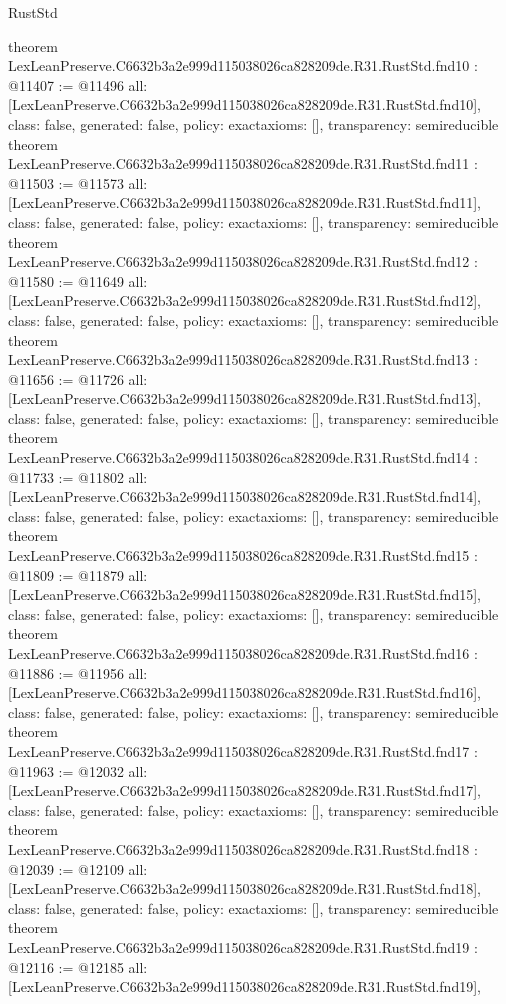 \begin{lexlean}{RustStd}
\begin{coremodule}
{}
theorem LexLeanPreserve.C6632b3a2e999d115038026ca828209de.R31.RustStd.fnd10 : @11407 := @11496 {
  all: [LexLeanPreserve.C6632b3a2e999d115038026ca828209de.R31.RustStd.fnd10],
  class: false,
  generated: false,
  policy: exact{axioms: []},
  transparency: semireducible
}
theorem LexLeanPreserve.C6632b3a2e999d115038026ca828209de.R31.RustStd.fnd11 : @11503 := @11573 {
  all: [LexLeanPreserve.C6632b3a2e999d115038026ca828209de.R31.RustStd.fnd11],
  class: false,
  generated: false,
  policy: exact{axioms: []},
  transparency: semireducible
}
theorem LexLeanPreserve.C6632b3a2e999d115038026ca828209de.R31.RustStd.fnd12 : @11580 := @11649 {
  all: [LexLeanPreserve.C6632b3a2e999d115038026ca828209de.R31.RustStd.fnd12],
  class: false,
  generated: false,
  policy: exact{axioms: []},
  transparency: semireducible
}
theorem LexLeanPreserve.C6632b3a2e999d115038026ca828209de.R31.RustStd.fnd13 : @11656 := @11726 {
  all: [LexLeanPreserve.C6632b3a2e999d115038026ca828209de.R31.RustStd.fnd13],
  class: false,
  generated: false,
  policy: exact{axioms: []},
  transparency: semireducible
}
theorem LexLeanPreserve.C6632b3a2e999d115038026ca828209de.R31.RustStd.fnd14 : @11733 := @11802 {
  all: [LexLeanPreserve.C6632b3a2e999d115038026ca828209de.R31.RustStd.fnd14],
  class: false,
  generated: false,
  policy: exact{axioms: []},
  transparency: semireducible
}
theorem LexLeanPreserve.C6632b3a2e999d115038026ca828209de.R31.RustStd.fnd15 : @11809 := @11879 {
  all: [LexLeanPreserve.C6632b3a2e999d115038026ca828209de.R31.RustStd.fnd15],
  class: false,
  generated: false,
  policy: exact{axioms: []},
  transparency: semireducible
}
theorem LexLeanPreserve.C6632b3a2e999d115038026ca828209de.R31.RustStd.fnd16 : @11886 := @11956 {
  all: [LexLeanPreserve.C6632b3a2e999d115038026ca828209de.R31.RustStd.fnd16],
  class: false,
  generated: false,
  policy: exact{axioms: []},
  transparency: semireducible
}
theorem LexLeanPreserve.C6632b3a2e999d115038026ca828209de.R31.RustStd.fnd17 : @11963 := @12032 {
  all: [LexLeanPreserve.C6632b3a2e999d115038026ca828209de.R31.RustStd.fnd17],
  class: false,
  generated: false,
  policy: exact{axioms: []},
  transparency: semireducible
}
theorem LexLeanPreserve.C6632b3a2e999d115038026ca828209de.R31.RustStd.fnd18 : @12039 := @12109 {
  all: [LexLeanPreserve.C6632b3a2e999d115038026ca828209de.R31.RustStd.fnd18],
  class: false,
  generated: false,
  policy: exact{axioms: []},
  transparency: semireducible
}
theorem LexLeanPreserve.C6632b3a2e999d115038026ca828209de.R31.RustStd.fnd19 : @12116 := @12185 {
  all: [LexLeanPreserve.C6632b3a2e999d115038026ca828209de.R31.RustStd.fnd19],
}
\end{coremodule}
\end{lexlean}
